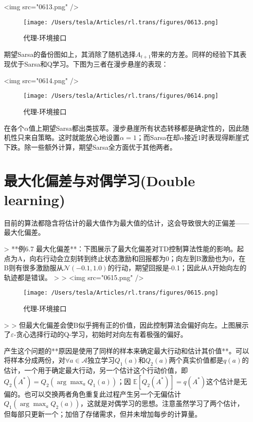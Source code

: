 \documentclass{ctexart}
\begin{document}
<img src="0613.png" />
\begin{figure}[htbp]
    \centering
    \texttt{[image: /Users/tesla/Articles/rl.trans/figures/0613.png]}
    \caption{代理-环境接口}
    \label{fig:0613} 
\end{figure}

期望Sarsa的备份图如上，其消除了随机选择$A_{t+1}$带来的方差。同样的经验下其表现优于Sarsa和Q学习。下图为三者在漫步悬崖的表现：

<img src="0614.png" />
\begin{figure}[htbp]
    \centering
    \texttt{[image: /Users/tesla/Articles/rl.trans/figures/0614.png]}
    \caption{代理-环境接口}
    \label{fig:0614} 
\end{figure}

在各个$\alpha$值上期望Sarsa都出类拔萃。漫步悬崖所有状态转移都是确定性的，因此随机性只来自策略。这时就能放心地设置$\alpha=1$；而Sarsa在却$\alpha$接近1时表现得断崖式下跌。除一些额外计算，期望Sarsa全方面优于其他两者。



\section{最大化偏差与对偶学习(Double learning)}

目前的算法都隐含将估计的最大值作为最大值的估计，这会导致很大的正偏差——最大化偏差。

> **例6.7 最大化偏差**：下图展示了最大化偏差对TD控制算法性能的影响。起点为A，向右行动会立刻转到终止状态激励和回报都为0；向左到B激励也为0，在B则有很多激励服从$\mathcal N(-0.1,1.0)$的行动，期望回报是-0.1；因此从A开始向左的轨迹都是错误。
>
> <img src="0615.png" />
\begin{figure}[htbp]
    \centering
    \texttt{[image: /Users/tesla/Articles/rl.trans/figures/0615.png]}
    \caption{代理-环境接口}
    \label{fig:0615} 
\end{figure}
>
> 但最大化偏差会使B似乎拥有正的价值，因此控制算法会偏好向左。上图展示了$\varepsilon$-贪心选择行动的Q-学习，初始时对向左有着极强的偏好。

产生这个问题的**原因是使用了同样的样本来确定最大行动和估计其价值**。可以将样本分成两份，对$\forall a\in\mathcal A$独立学习$Q_1(a)$和$Q_2(a)$两个真实价值都是$q(a)$的估计，一个用于确定最大行动，另一个估计这个行动价值，即$Q_2\left(A^*\right)=Q_2\left(\arg\max_aQ_1(a)\right)$；因 $\mathbb E\left[Q_2\left(A^*\right)\right]=q\left(A^*\right)$这个估计是无偏的。也可以交换两者角色重复此过程产生另一个无偏估计$Q_1\left(\arg\max_aQ_2(a)\right)$，这就是对偶学习的思想。注意虽然学习了两个估计，但每部只更新一个；加倍了存储需求，但并未增加每步的计算量。
\end{document}
